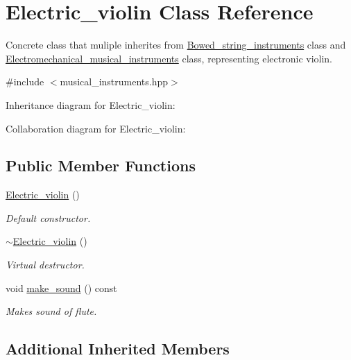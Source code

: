 \hypertarget{classElectric__violin}{}\section{Electric\+\_\+violin Class Reference}
\label{classElectric__violin}


Concrete class that muliple inherites from \hyperlink{classBowed__string__instruments}{Bowed\+\_\+string\+\_\+instruments} class and \hyperlink{classElectromechanical__musical__instruments}{Electromechanical\+\_\+musical\+\_\+instruments} class, representing electronic violin.  




{\ttfamily \#include $<$musical\+\_\+instruments.\+hpp$>$}



Inheritance diagram for Electric\+\_\+violin\+:


Collaboration diagram for Electric\+\_\+violin\+:
\subsection*{Public Member Functions}
\begin{DoxyCompactItemize}
\item 
\hyperlink{classElectric__violin_aad7b5f386f05ae8e1ce4b056f6cfd022}{Electric\+\_\+violin} ()
\begin{DoxyCompactList}\small\item\em Default constructor. \end{DoxyCompactList}\item 
\hyperlink{classElectric__violin_a79abc6ea1e72c10cd00e469f5ac071de}{$\sim$\+Electric\+\_\+violin} ()
\begin{DoxyCompactList}\small\item\em Virtual destructor. \end{DoxyCompactList}\item 
void \hyperlink{classElectric__violin_a2dfee8b1652d97285cca27581c89b695}{make\+\_\+sound} () const 
\begin{DoxyCompactList}\small\item\em Makes sound of flute. \end{DoxyCompactList}\end{DoxyCompactItemize}
\subsection*{Additional Inherited Members}


